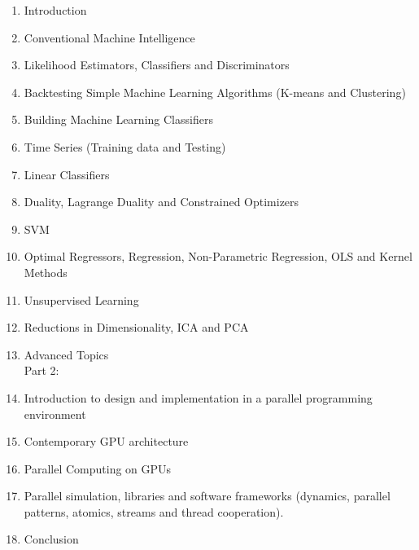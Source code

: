 \documentclass[7pt]{article}
\begin{document}
\begin{enumerate}
\item	 Introduction \\
\item	Conventional Machine Intelligence \\
\item   	 Likelihood Estimators, Classifiers and Discriminators
 \\
\item    	Backtesting Simple Machine Learning Algorithms (K-means and Clustering)
\\
\item  	Building Machine Learning Classifiers 
\\
\item     	Time Series (Training data and Testing)
\\
\item   	Linear Classifiers
\\
\item    	Duality, Lagrange Duality and Constrained Optimizers
\\
\item   	SVM 
\\
\item  	Optimal Regressors, Regression, Non-Parametric Regression, OLS and Kernel Methods
\\
\item   	Unsupervised Learning
\\
\item	Reductions in Dimensionality, ICA and PCA
\\
\item	Advanced Topics
\vspace{0.25in}
\\Part 2:
\item 	Introduction to design and implementation in a parallel programming environment
\\
\item 	Contemporary GPU architecture
\\
\item  	Parallel Computing on GPUs
\\
\item 	Parallel simulation, libraries and software frameworks (dynamics, parallel  patterns, atomics, streams and thread cooperation). 
\\
\item 	Conclusion
\end{enumerate}
\end{document}

